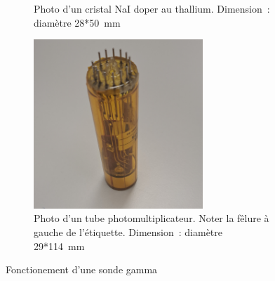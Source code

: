 \begin{figure}
\begin{subfigure}[t]{0.5\textwidth}
        \caption[Photo d'un cristal NaI]{Photo d'un cristal NaI doper au thallium. Dimension~: diamètre 28*50~mm}
        \label{fig_Nai}
    \end{subfigure}
    \begin{subfigure}[t]{0.5\textwidth}
        \centering
        \includegraphics[width=0.7\textwidth]{img/photo/PMT.jpg}
        
        \caption[Photo d'un tube photomultiplicateur]{Photo d'un tube photomultiplicateur. Noter la fêlure à gauche de l'étiquette. Dimension~: diamètre 29*114~mm}
        \label{fig_PMT}
    \end{subfigure}
    \caption{Fonctionement d'une sonde gamma}

\end{figure}
